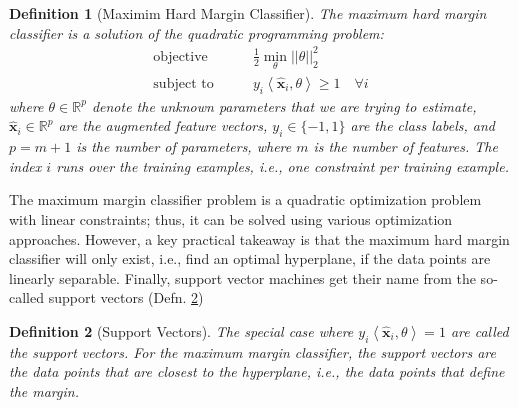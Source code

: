 \documentclass{article}[11pt]
\newtheorem{defn}{Definition}
\def\R{\mathbb{R}}
\newcommand{\norm}[1]{\left|\left|#1\right|\right|}
\begin{document}
\begin{mdframed}
\begin{defn}[Maximim Hard Margin Classifier]\label{defn:max-margin}
The maximum hard margin classifier is a solution of the quadratic programming problem:
\begin{align*}
    \text{objective}\qquad & \frac{1}{2}\min_{\theta}\norm{\theta}_{2}^{2}\\
    \text{subject to}\qquad & y_{i}\left<\hat{\mathbf{x}}_{i},\theta\right> \geq 1\quad\forall i
\end{align*}
where $\theta\in\R^{p}$ denote the unknown parameters that we are trying to estimate,
$\hat{\mathbf{x}}_{i}\in\R^{p}$ are the augmented feature vectors, $y_{i}\in\{-1,1\}$ are the class labels, and $p=m+1$ is the number of parameters, where $m$ is the number of features.
The index $i$ runs over the training examples, i.e., one constraint per training example.
\end{defn}
The maximum margin classifier problem is a quadratic optimization problem with linear constraints; thus, it can be solved using various optimization approaches.
However, a key practical takeaway is that the maximum hard margin classifier will only exist, i.e., find an optimal hyperplane, if the data points are linearly separable.
Finally, support vector machines get their name from the so-called support vectors (Defn. \ref{defn:max-margin-support-vector})
\begin{defn}[Support Vectors]\label{defn:max-margin-support-vector}
The special case where $y_{i}\left<\hat{\mathbf{x}}_{i},\theta\right> = 1$ are called the \textit{support vectors}. 
For the maximum margin classifier, the support vectors are the data points that are closest to the hyperplane, i.e., the data points that define the margin.
\end{defn}
\end{mdframed}
\end{document}
